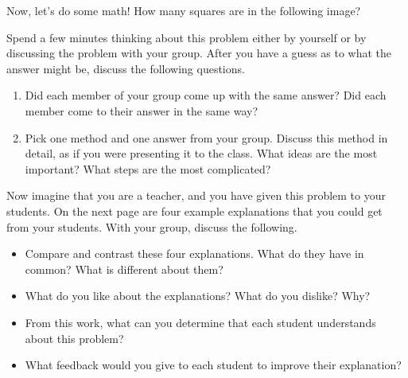 \documentclass[noauthor,nooutcomes]{ximera}
\begin{document}
\newpage


Now, let's do some math! How many squares are in the following image?
\begin{center}
\end{center}


\begin{problem} 
Spend a few minutes thinking about this problem either by yourself or by discussing the problem with your group.  After you have a guess as to what the answer might be, discuss the following questions.
\begin{enumerate}
\item Did each member of your group come up with the same answer?  Did each member come to their answer in the same way?



\item
Pick one method and one answer from your group.  Discuss this method in detail, as if you were presenting it to the class.  What ideas are the most important?  What steps are the most complicated?

\end{enumerate}
\end{problem}

\begin{problem} 
Now imagine that you are a teacher, and you have given this problem to your students.  On the next page are four example explanations that you could get from your students.  With your group, discuss the following.
\begin{itemize}
\item Compare and contrast these four explanations. What do they have in common? What is different about them?
\item What do you like about the explanations? What do you dislike? Why?
\item From this work, what can you determine that each student understands about this problem?
\item What feedback would you give to each student to improve their explanation?
\end{itemize}
\end{problem}
\newpage
\end{document}

